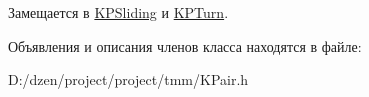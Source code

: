 Замещается в \hyperlink{class_k_p_sliding_abc8a7db0983bf9b9b5c525ab5682b531}{KPSliding} и \hyperlink{class_k_p_turn_a7997ae3d88f2c69a07d3982c152bc9f7}{KPTurn}.



Объявления и описания членов класса находятся в файле:\begin{DoxyCompactItemize}
\item 
D:/dzen/project/project/tmm/KPair.h\end{DoxyCompactItemize}
